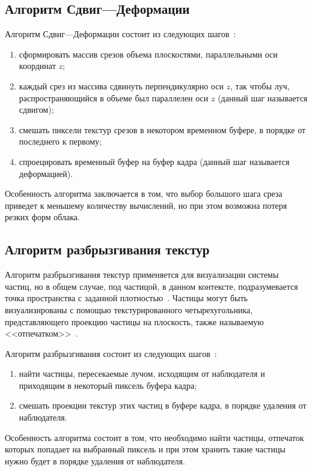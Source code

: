\subsection{Алгоритм Сдвиг---Деформации}
\label{slice}

Алгоритм Сдвиг---Деформации состоит из следующих шагов~\cite{shearwarp}:
\begin{enumerate}
	\item сформировать массив срезов объема плоскостями, параллельными оси координат $z$;
	\item каждый срез из массива сдвинуть перпендикулярно оси $z$, так чтобы луч, распространяющийся в объеме был параллелен оси $z$ (данный шаг называется сдвигом); 
	\item смешать пиксели текстур срезов в некотором временном буфере, в порядке от последнего к первому;
	\item спроецировать временный буфер на буфер кадра (данный шаг называется деформацией).
\end{enumerate}

Особенность алгоритма заключается в том, что выбор большого шага среза приведет к меньшему количеству вычислений, но при этом возможна потеря резких форм облака.


\subsection{Алгоритм разбрызгивания текстур}
\label{splatting}
Алгоритм разбрызгивания текстур применяется для визуализации системы частиц, но в общем случае, под частицой, в данном контексте, подразумевается точка пространства с заданной плотностью~\cite{clouds}.
Частицы могут быть визуализированы с помощью текстурированного четырехугольника, представляющего проекцию частицы на плоскость, также называемую <<отпечатком>>~\mbox{\cite{clouds, voxel}}. 

Алгоритм разбрызгивания состоит из следующих шагов~\mbox{\cite{voxel, clouds}}:
\begin{enumerate}
	\item найти частицы, пересекаемые лучом, исходящим от наблюдателя и приходящим в некоторый пиксель буфера кадра;
	\item смешать проекции текстур этих частиц в буфере кадра, в порядке удаления от наблюдателя.
\end{enumerate} 

Особенность алгоритма состоит в том, что необходимо найти частицы, отпечаток которых попадает на выбранный пиксель и при этом хранить такие частицы нужно будет в порядке удаления от наблюдателя.

